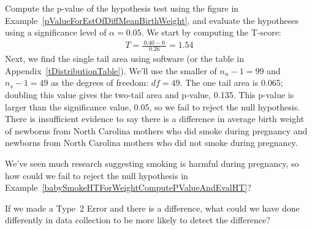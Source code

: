 \begin{examplewrap}
\begin{nexample}{Compute the p-value of the hypothesis
    test using the figure in
    Example~\ref{pValueForEstOfDiffMeanBirthWeight},
    and evaluate the hypotheses using a significance
    level of $\alpha=0.05$.}
  \label{babySmokeHTForWeightComputePValueAndEvalHT}%
  We start by computing the T-score:
  \begin{align*}
  T = \frac{\ 0.40 - 0\ }{0.26} = 1.54
  \end{align*}
  Next, we find the single tail area using software
  (or the table in Appendix~\vref{tDistributionTable}).
  We'll use the
  smaller of $n_n - 1 = 99$ and $n_s - 1 = 49$ as the
  degrees of freedom: $df = 49$.
  The one tail area is 0.065;
  doubling this value gives the two-tail area and p-value,
  0.135.
  This p-value is larger than the significance value, 0.05,
  so we fail to reject the null hypothesis.
  There is insufficient evidence to say there is a difference
  in average birth weight of newborns from North Carolina mothers
  who did smoke during pregnancy and newborns from North Carolina
  mothers who did not smoke during pregnancy.
\end{nexample}
\end{examplewrap}

\begin{exercisewrap}
\begin{nexercise}
We've seen much research suggesting smoking is harmful
during pregnancy, so how could we fail to reject the null
hypothesis in
Example~\ref{babySmokeHTForWeightComputePValueAndEvalHT}?
\footnotemark{}
\end{nexercise}
\end{exercisewrap}

\begin{exercisewrap}
\begin{nexercise}
\label{babySmokeHTIDingHowToDetectDifferences}%
If we made a Type~2 Error and there is a difference,
what could we have done differently in data collection
to be more likely to detect the difference?\footnotemark{}
\end{nexercise}
\end{exercisewrap}

